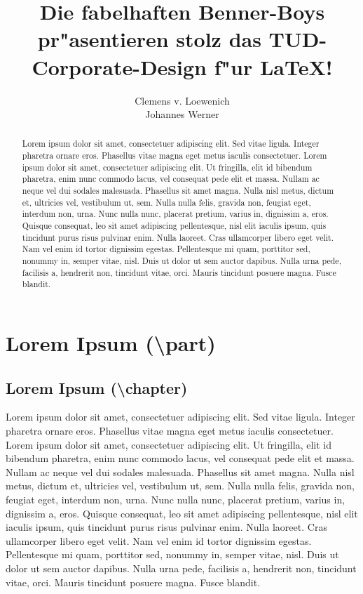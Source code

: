 \documentclass[nochapterpage,bigchapter,linedtoc,longdoc,colorback,accentcolor=tud3a]{tudreport}
\title{Die fabelhaften Benner-Boys pr"asentieren
  stolz das TUD-\\Corporate-Design f"ur {\LaTeX}!}
\subtitle{Clemens v. Loewenich\\Johannes Werner}
\begin{document}
\maketitle
\begin{abstract}
    Lorem ipsum dolor sit amet, consectetuer adipiscing elit. Sed vitae ligula. Integer pharetra ornare eros. Phasellus vitae magna eget metus iaculis consectetuer. Lorem ipsum dolor sit amet, consectetuer adipiscing elit. Ut fringilla, elit id bibendum pharetra, enim nunc commodo lacus, vel consequat pede elit et massa. Nullam ac neque vel dui sodales malesuada. Phasellus sit amet magna. Nulla nisl metus, dictum et, ultricies vel, vestibulum ut, sem. Nulla nulla felis, gravida non, feugiat eget, interdum non, urna. Nunc nulla nunc, placerat pretium, varius in, dignissim a, eros. Quisque consequat, leo sit amet adipiscing pellentesque, nisl elit iaculis ipsum, quis tincidunt purus risus pulvinar enim. Nulla laoreet. Cras ullamcorper libero eget velit. Nam vel enim id tortor dignissim egestas. Pellentesque mi quam, porttitor sed, nonummy in, semper vitae, nisl. Duis ut dolor ut sem auctor dapibus. Nulla urna pede, facilisis a, hendrerit non, tincidunt vitae, orci. Mauris tincidunt posuere magna. Fusce blandit.
\end{abstract}  

\tableofcontents
\part{Lorem Ipsum (\textbackslash part)\label{part_lorem}}

  \chapter{Lorem Ipsum (\textbackslash chapter)}

    Lorem ipsum dolor sit amet, consectetuer adipiscing elit. Sed vitae ligula. Integer pharetra ornare eros. Phasellus vitae magna eget metus iaculis consectetuer. Lorem ipsum dolor sit amet, consectetuer adipiscing elit. Ut fringilla, elit id bibendum pharetra, enim nunc commodo lacus, vel consequat pede elit et massa. Nullam ac neque vel dui sodales malesuada. Phasellus sit amet magna. Nulla nisl metus, dictum et, ultricies vel, vestibulum ut, sem. Nulla nulla felis, gravida non, feugiat eget, interdum non, urna. Nunc nulla nunc, placerat pretium, varius in, dignissim a, eros. Quisque consequat, leo sit amet adipiscing pellentesque, nisl elit iaculis ipsum, quis tincidunt purus risus pulvinar enim. Nulla laoreet. Cras ullamcorper libero eget velit. Nam vel enim id tortor dignissim egestas. Pellentesque mi quam, porttitor sed, nonummy in, semper vitae, nisl. Duis ut dolor ut sem auctor dapibus. Nulla urna pede, facilisis a, hendrerit non, tincidunt vitae, orci. Mauris tincidunt posuere magna. Fusce blandit.
\end{document}
